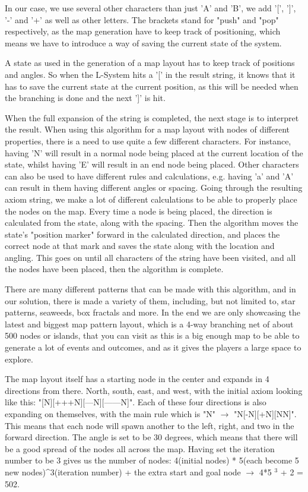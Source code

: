 In our case, we use several other characters than just 'A' and 'B', we add '[', ']', '-' and '+' as well as other letters. The brackets stand for "push" and "pop" respectively, as the map generation have to keep track of positioning, which means we have to introduce a way of saving the current state of the system.

A state as used in the generation of a map layout has to keep track of positions and angles. So when the L-System hits a '[' in the result string, it knows that it has to save the current state at the current position, as this will be needed when the branching is done and the next ']' is hit. 

When the full expansion of the string is completed, the next stage is to interpret the result. When using this algorithm for a map layout with nodes of different properties, there is a need to use quite a few different characters. For instance, having 'N' will result in a normal node being placed at the current location of the state, whilst having 'E' will result in an end node being placed. Other characters can also be used to have different rules and calculations, e.g. having 'a' and 'A' can result in them having different angles or spacing.
Going through the resulting axiom string, we make a lot of different calculations to be able to properly place the nodes on the map. Every time a node is being placed, the direction is calculated from the state, along with the spacing. Then the algorithm moves the state's "position marker" forward in the calculated direction, and places the correct node at that mark and saves the state along with the location and angling.
This goes on until all characters of the string have been visited, and all the nodes have been placed, then the algorithm is complete.

There are many different patterns that can be made with this algorithm, and in our solution, there is made a variety of them, including, but not limited to, star patterns, seaweeds, box fractals and more. 
In the end we are only showcasing the latest and biggest map pattern layout, which is a 4-way branching net of about 500 nodes or islands, that you can visit as this is a big enough map to be able to generate a lot of events and outcomes, and as it gives the players a large space to explore.

The map layout itself has a starting node in the center and expands in 4 directions from there. North, south, east, and west, with the initial axiom looking like this: "[N][+++N][---N][------N]". Each of these four directions is also expanding on themselves, with the main rule which is "N" $\rightarrow$ "N[-N][+N][NN]". This means that each node will spawn another to the left, right, and two in the forward direction. The angle is set to be 30 degrees, which means that there will be a good spread of the nodes all across the map. Having set the iteration number to be 3 gives us the number of nodes: 4(initial nodes) * 5(each become 5 new nodes)\textasciicircum 3(iteration number) + the extra start and goal node $\rightarrow$ 4*5 $ ^3 $ + 2 = 502.

